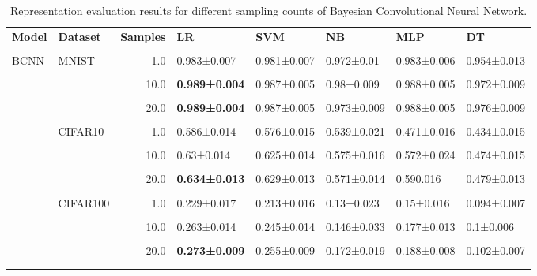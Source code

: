\begin{table}[]
    \centering
    \footnotesize
    \begin{tabular}{llrlllll}\n\toprule\n \textbf{Model} & \textbf{Dataset}  &  \textbf{Samples} &          \textbf{LR} &         \textbf{SVM} &          \textbf{NB} &         \textbf{MLP} &          \textbf{DT} \\\\\n\midrule\n   BCNN  & MNIST &      1.0 & 0.983±0.007 & 0.981±0.007 &  0.972±0.01 & 0.983±0.006 & 0.954±0.013 \\\\\n    &  &     10.0 & \textbf{0.989±0.004} & 0.987±0.005 &  0.98±0.009 & 0.988±0.005 & 0.972±0.009 \\\\\n    &  &     20.0 & \textbf{0.989±0.004} & 0.987±0.005 &  0.973±0.009 & 0.988±0.005 & 0.976±0.009 \\\\\n & CIFAR10 &      1.0 & 0.586±0.014 & 0.576±0.015 & 0.539±0.021 & 0.471±0.016 & 0.434±0.015 \\\\\n  &  &     10.0 &  0.63±0.014 & 0.625±0.014 & 0.575±0.016 & 0.572±0.024 & 0.474±0.015 \\\\\n  &  &     20.0 & \textbf{0.634±0.013} & 0.629±0.013 & 0.571±0.014 & 0.590.016 & 0.479±0.013 \\\\\n  & CIFAR100 &      1.0 & 0.229±0.017 & 0.213±0.016 &  0.13±0.023 &  0.15±0.016 & 0.094±0.007 \\\\\n  &  &     10.0 & 0.263±0.014 & 0.245±0.014 & 0.146±0.033 & 0.177±0.013 &   0.1±0.006 \\\\\n  &  &     20.0 & \textbf{0.273±0.009} & 0.255±0.009 & 0.172±0.019 & 0.188±0.008 & 0.102±0.007 \\\\\n\bottomrule\n
    \end{tabular}
    \caption[Representations evaluation for sampling counts of ]{Representation evaluation results for different sampling counts of Bayesian Convolutional Neural Network.}
    \label{tab:bnn_cnn_sampling}
\end{table}